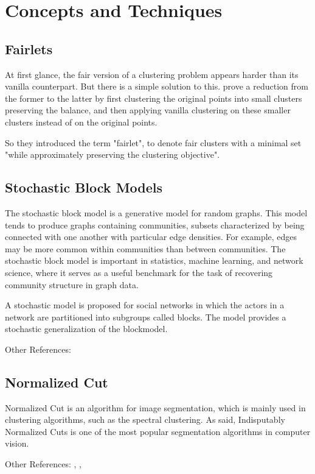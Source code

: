 \section{Concepts and Techniques}


\subsection{Fairlets}

At first glance, the fair version of a clustering problem appears harder than its vanilla counterpart. \autocite[5]{Chierichetti2018} But there is a simple solution to this. \textcite[5]{Chierichetti2018} prove a reduction from the former to the latter by first clustering the original points into small clusters preserving the balance, and then applying vanilla clustering on these smaller clusters instead of on the original points.

So they introduced the term "fairlet", to denote fair clusters with a minimal set "while approximately preserving the clustering objective". \autocite[]{Chierichetti2018}


\subsection{Stochastic Block Models}
The stochastic block model is a generative model for random graphs. This model tends to produce graphs containing communities, subsets characterized by being connected with one another with particular edge densities. For example, edges may be more common within communities than between communities. The stochastic block model is important in statistics, machine learning, and network science, where it serves as a useful benchmark for the task of recovering community structure in graph data.

A stochastic model is proposed for social networks in which the actors in a network are partitioned into subgroups called blocks. The model provides a stochastic generalization of the blockmodel. \autocite[]{Holland1983}


Other References: \textcite[]{Lei2013}

\subsection{Normalized Cut}
Normalized Cut is an algorithm for image segmentation, which is mainly used in clustering algorithms, such as the spectral clustering.
As \textcite[]{Eriksson2011} said, Indisputably Normalized Cuts is one of the most popular segmentation algorithms in computer vision.

Other References: 
\textcite[]{Xu2010},
\textcite[]{Yu2004},
\textcite[]{Shi2000}